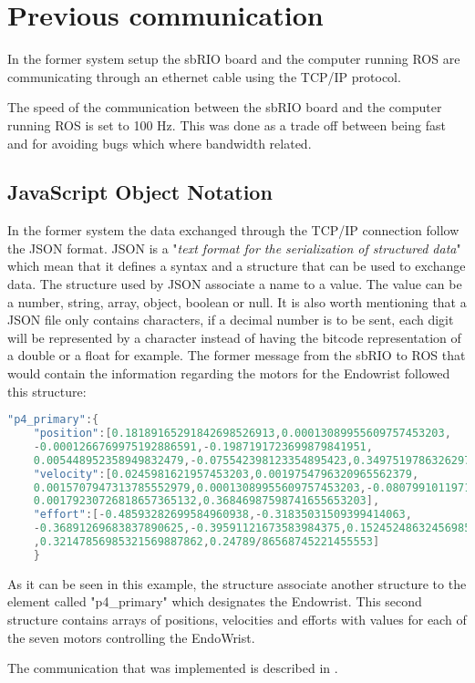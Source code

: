 

 \section{Previous communication}
In the former system setup the sbRIO board and the computer running ROS are communicating through an ethernet cable using the TCP/IP protocol.

The speed of the communication between the sbRIO board and the computer running ROS is set to 100 Hz. This was done as a trade off between being fast and for avoiding bugs which where bandwidth related\cite{Chris_Surgical}.

\subsection{JavaScript Object Notation}\label{subsec:JSON}
In the former system the data exchanged through the TCP/IP connection follow the \gls{JSON} format. \gls{JSON} is a "\textit{text format for the serialization of structured data}"\cite{JSON_IETF} which mean that it defines a syntax and a structure that can be used to exchange data. The structure used by \gls{JSON} associate a name to a value. The value can be a number, string, array, object, boolean or null. It is also worth mentioning that a \gls{JSON} file only contains characters, if a decimal number is to be sent, each digit will be represented by a character instead of having the bitcode representation of a double or a float for example. The former message from the sbRIO to ROS that would contain the information regarding the motors for the Endowrist followed this structure:

\begin{lstlisting}[language=C]
"p4_primary":{
	"position":[0.18189165291842698526913,0.00013089955609757453203,
	-0.0001266769975192886591,-0.1987191723699879841951,
	0.005448952358949832479,-0.075542398123354895423,0.34975197863262971333179],
	"velocity":[0.0245981621957453203,0.0019754796320965562379,
	0.0015707947313785552979,0.00013089955609757453203,-0.08079910119712697,
	0.00179230726818657365132,0.36846987598741655653203],
	"effort":[-0.48593282699584960938,-0.31835031509399414063,
	-0.36891269683837890625,-0.39591121673583984375,0.15245248632456985325663
	,0.32147856985321569887862,0.24789/86568745221455553]
	}
\end{lstlisting}

As it can be seen in this example, the structure associate another structure to the element called "p4\_primary" which designates the Endowrist. This second structure contains arrays of positions, velocities and efforts with values for each of the seven motors controlling the EndoWrist.

The communication that was implemented is described in .%